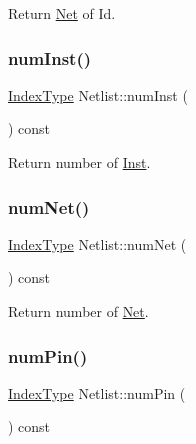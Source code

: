 Return \hyperlink{classNet}{Net} of Id. 

\mbox{\label{classNetlist_aa9b8924df39d788ba5f70f11ea083fea}} 
\subsubsection{\texorpdfstring{num\+Inst()}{numInst()}}
{\footnotesize\ttfamily \hyperlink{type_8h_a581e8093e28e7362f2b6937296190676}{Index\+Type} Netlist\+::num\+Inst (\begin{DoxyParamCaption}{ }\end{DoxyParamCaption}) const\hspace{0.3cm}{\ttfamily [inline]}}



Return number of \hyperlink{classInst}{Inst}. 

\mbox{\label{classNetlist_aead543556d8cea4364a852d1bb2e3b68}} 
\subsubsection{\texorpdfstring{num\+Net()}{numNet()}}
{\footnotesize\ttfamily \hyperlink{type_8h_a581e8093e28e7362f2b6937296190676}{Index\+Type} Netlist\+::num\+Net (\begin{DoxyParamCaption}{ }\end{DoxyParamCaption}) const\hspace{0.3cm}{\ttfamily [inline]}}



Return number of \hyperlink{classNet}{Net}. 

\mbox{\label{classNetlist_a90a41d0d2a05b8036589136916f2a27b}} 
\subsubsection{\texorpdfstring{num\+Pin()}{numPin()}}
{\footnotesize\ttfamily \hyperlink{type_8h_a581e8093e28e7362f2b6937296190676}{Index\+Type} Netlist\+::num\+Pin (\begin{DoxyParamCaption}{ }\end{DoxyParamCaption}) const\hspace{0.3cm}{\ttfamily [inline]}}




